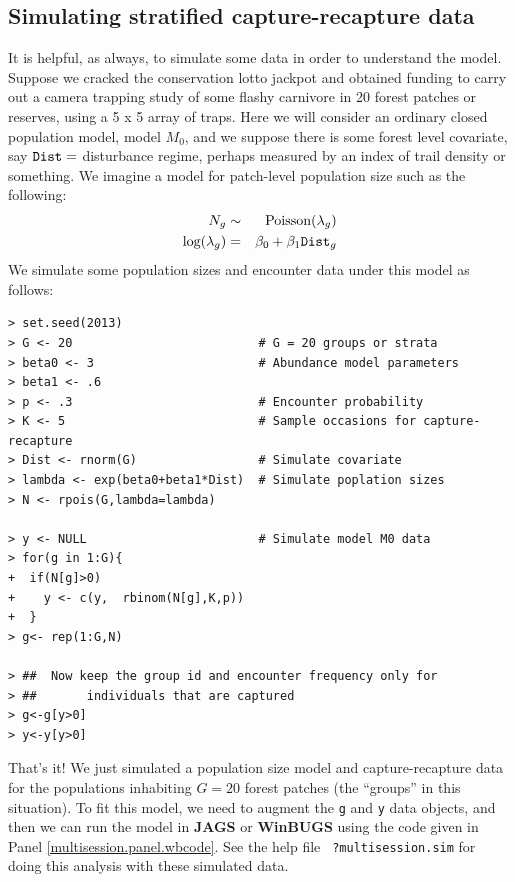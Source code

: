 \subsection{
Simulating stratified
capture-recapture data
}

It is helpful, as always, to simulate some data in order to understand
the model. Suppose we cracked the conservation lotto jackpot and
obtained funding to carry out a camera trapping study of some flashy
carnivore in 20 forest patches or reserves, using a 5 x 5 array of
traps. Here we will consider an ordinary closed population model,
model $M_0$, and we suppose there is some forest level covariate, say
$\mbox{\tt Dist} = $ disturbance regime, perhaps measured by an index
of trail density or something.  We imagine a model for patch-level
population size such as the following:
\begin{eqnarray*}
N_{g} &\sim& \mbox{Poisson}(\lambda_{g})  \\
\mbox{log}(\lambda_{g})& = &\beta_{0} + \beta_{1} \mbox{\tt Dist}_{g}
\end{eqnarray*}
We simulate some population sizes and encounter data under this model
as follows:
\begin{verbatim}
> set.seed(2013)
> G <- 20                          # G = 20 groups or strata
> beta0 <- 3                       # Abundance model parameters
> beta1 <- .6
> p <- .3                          # Encounter probability
> K <- 5                           # Sample occasions for capture-recapture
> Dist <- rnorm(G)                 # Simulate covariate
> lambda <- exp(beta0+beta1*Dist)  # Simulate poplation sizes
> N <- rpois(G,lambda=lambda)

> y <- NULL                        # Simulate model M0 data
> for(g in 1:G){
+  if(N[g]>0)
+    y <- c(y,  rbinom(N[g],K,p))
+  }
> g<- rep(1:G,N)

> ##  Now keep the group id and encounter frequency only for
> ##       individuals that are captured
> g<-g[y>0]
> y<-y[y>0]
\end{verbatim}
That's it!  We just simulated a population size model and
capture-recapture data for the populations inhabiting $G=20$ forest
patches (the ``groups'' in this situation). To fit this model, we need
to augment the \mbox{\tt g} and \mbox{\tt y} data objects, and then we
can run the model in {\bf JAGS} or {\bf WinBUGS} using the code given
in Panel \ref{multisession.panel.wbcode}.  See the help file \mbox{\tt
  ?multisession.sim} for doing this analysis with these simulated
data.


